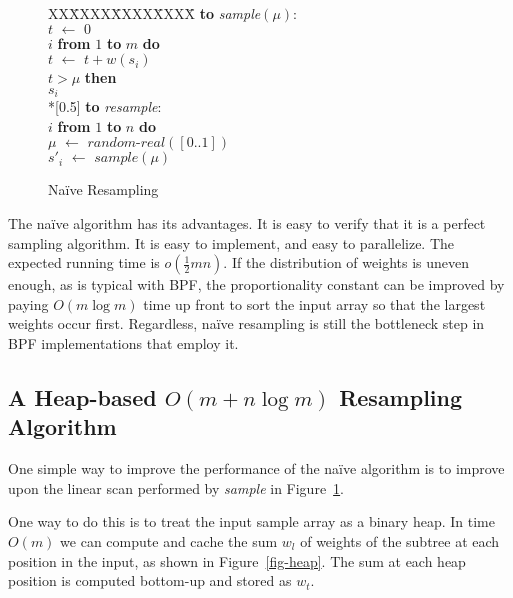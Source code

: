 \documentclass[12pt]{article}
\newcommand{\asgn}{\,\,\leftarrow\,\,}
\newcommand{\newcode}{\\*[0.5\baselineskip]}
\begin{document}
  \begin{figure}
    \centering
    \begin{minipage}{0.6\textwidth}
      \begin{tabbing}
      XX\=XXXX\=XXXX\=XXXX\=\kill
      {\bf to} {\it sample}$(\mu)$: \\
      \>$t \asgn 0$ \\
       $i$ {\bf from} $1$ {\bf to} $m$ {\bf do} \\
      \>\>$t \asgn t + w(s_i)$ \\
      \> $t > \mu$ {\bf then} \\
      \>\> $s_i$ \newcode
      {\bf to} {\it resample}: \\
       $i$ {\bf from} $1$ {\bf to} $n$ {\bf do} \\
      \>\>$\mu \asgn \textit{random-real}([0..1])$ \\
      \>\>$s'_i \asgn sample(\mu)$
      \end{tabbing}
    \end{minipage}
    \caption{Na\"ive Resampling}\label{fig-omn}
  \end{figure}

  The na\"ive algorithm has its advantages.  It is easy to
  verify that it is a perfect sampling algorithm.  It is
  easy to implement, and easy to parallelize.  The expected
  running time is $o(\frac{1}{2}mn)$.  If the distribution
  of weights is uneven enough, as is typical with BPF, the
  proportionality constant can be improved by paying $O(m
  \log m)$ time up front to sort the input array so that the
  largest weights occur first.  Regardless, na\"ive
  resampling is still the bottleneck step in BPF
  implementations that employ it.

\subsection{A Heap-based $O(m + n \log m)$ Resampling Algorithm}\label{sec-heap}

  One simple way to improve the performance of the na\"ive
  algorithm is to improve upon the linear scan performed by
  {\em sample} in Figure~\ref{fig-omn}.

  One way to do this is to treat the input sample array as a
  binary heap.  In time $O(m)$ we can compute and cache the
  sum $w_l$ of weights of the subtree at each position in
  the input, as shown in Figure~\ref{fig-heap}.  The sum at
  each heap position is computed bottom-up and stored as
  $w_t$.
\end{document}
